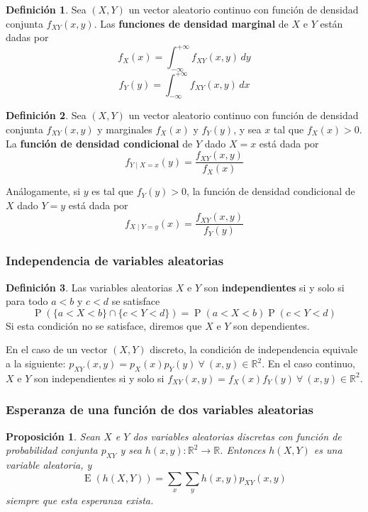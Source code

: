 \documentclass[11pt]{article}
\theoremstyle{plain}
\newtheorem*{pro}{Proposición}
\theoremstyle{definition}
\newtheorem*{defi}{Definición}
\theoremstyle{remark}
\newcommand{\deft}[1]{\textbf{#1}}  %
\newcommand{\proba}{\ensuremath{\operatorname{P}}}  %
\newcommand{\esp}[0]{\ensuremath{\operatorname{E}}}  %
\newcommand{\foralle}{\ensuremath{\forall \ }}  %
\begin{document}
    \begin{defi}
      Sea $(X,Y)$ un vector aleatorio continuo con función de densidad conjunta $f_{XY}(x,y)$. Las \deft{funciones de densidad marginal} de $X$ e $Y$ están dadas por
      \[ f_X(x) = \int_{-\infty}^{+\infty} f_{XY}(x,y) \,dy \]
      \[ f_Y(y) = \int_{-\infty}^{+\infty} f_{XY}(x,y) \,dx \]
    \end{defi}

    \begin{defi}
      Sea $(X,Y)$ un vector aleatorio continuo con función de densidad conjunta $f_{XY}(x,y)$ y marginales $f_X(x)$ y $f_Y(y)$, y sea $x$ tal que $f_X(x) > 0$. La \deft{función de densidad condicional} de $Y$ dado $X = x$ está dada por
      \[ f_{Y \mid X = x}(y) = \frac{f_{XY}(x,y)}{f_X(x)} \]

      Análogamente, si $y$ es tal que $f_Y(y) > 0$, la función de densidad condicional de $X$ dado $Y = y$ está dada por
      \[ f_{X \mid Y = y}(x) = \frac{f_{XY}(x,y)}{f_Y(y)} \]
    \end{defi}

    \subsubsection{Independencia de variables aleatorias}

      \begin{defi}
        Las variables aleatorias $X$ e $Y$ son \deft{independientes} si y solo si para todo $a < b$ y $c < d$ se satisface
        \[ \proba(\lbrace a < X < b \rbrace \cap \lbrace c < Y < d \rbrace) = \proba(a < X < b) \proba(c < Y < d) \]
        Si esta condición no se satisface, diremos que $X$ e $Y$ son dependientes.
      \end{defi}

      En el caso de un vector $(X,Y)$ discreto, la condición de independencia equivale a la siguiente: $p_{XY}(x,y) = p_X(x) p_Y(y) \ \foralle (x,y) \in \mathbb{R}^2$. En el caso continuo, $X$ e $Y$ son independientes si y solo si $f_{XY}(x,y) = f_X(x) f_Y(y) \ \foralle (x,y) \in \mathbb{R}^2$.

    \subsubsection{Esperanza de una función de dos variables aleatorias}

      \begin{pro}
        Sean $X$ e $Y$ dos variables aleatorias discretas con función de probabilidad conjunta $p_{XY}$ y sea $h(x,y) : \mathbb{R}^2 \to \mathbb{R}$. Entonces $h(X,Y)$ es una variable aleatoria, y
        \[ \esp(h(X,Y)) = \sum_x \sum_y h(x,y) p_{XY}(x,y) \]
        siempre que esta esperanza exista.
      \end{pro}
\end{document}
